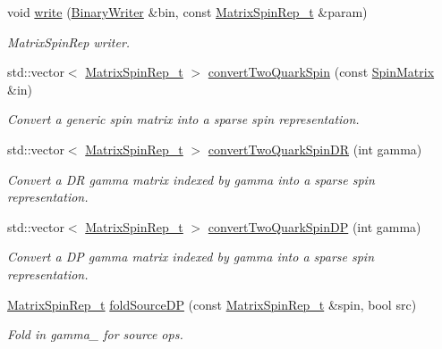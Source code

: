 \begin{DoxyCompactItemize}
void \mbox{\hyperlink{namespaceHadron_ae38baf2d1cfe9fdaf455f274e722b32f}{write}} (\mbox{\hyperlink{classADATIO_1_1BinaryWriter}{Binary\+Writer}} \&bin, const \mbox{\hyperlink{structHadron_1_1MatrixSpinRep__t}{Matrix\+Spin\+Rep\+\_\+t}} \&param)
\begin{DoxyCompactList}\small\item\em Matrix\+Spin\+Rep writer. \end{DoxyCompactList}\item 
std\+::vector$<$ \mbox{\hyperlink{structHadron_1_1MatrixSpinRep__t}{Matrix\+Spin\+Rep\+\_\+t}} $>$ \mbox{\hyperlink{namespaceHadron_a6bcb90f42724a0f4ce09eeb64bd54c80}{convert\+Two\+Quark\+Spin}} (const \mbox{\hyperlink{group__defs_gad066768e154e358a7f3c0708c774be29}{Spin\+Matrix}} \&in)
\begin{DoxyCompactList}\small\item\em Convert a generic spin matrix into a sparse spin representation. \end{DoxyCompactList}\item 
std\+::vector$<$ \mbox{\hyperlink{structHadron_1_1MatrixSpinRep__t}{Matrix\+Spin\+Rep\+\_\+t}} $>$ \mbox{\hyperlink{namespaceHadron_aadefc7d519d40f16cb37c4df644944e7}{convert\+Two\+Quark\+Spin\+DR}} (int gamma)
\begin{DoxyCompactList}\small\item\em Convert a DR gamma matrix indexed by gamma into a sparse spin representation. \end{DoxyCompactList}\item 
std\+::vector$<$ \mbox{\hyperlink{structHadron_1_1MatrixSpinRep__t}{Matrix\+Spin\+Rep\+\_\+t}} $>$ \mbox{\hyperlink{namespaceHadron_a9d2555db4b8f920142f7c79e6752eccd}{convert\+Two\+Quark\+Spin\+DP}} (int gamma)
\begin{DoxyCompactList}\small\item\em Convert a DP gamma matrix indexed by gamma into a sparse spin representation. \end{DoxyCompactList}\item 
\mbox{\hyperlink{structHadron_1_1MatrixSpinRep__t}{Matrix\+Spin\+Rep\+\_\+t}} \mbox{\hyperlink{namespaceHadron_aa258f26ea52528eac314f32a02bf8ac3}{fold\+Source\+DP}} (const \mbox{\hyperlink{structHadron_1_1MatrixSpinRep__t}{Matrix\+Spin\+Rep\+\_\+t}} \&spin, bool src)
\begin{DoxyCompactList}\small\item\em Fold in gamma\+\_ for source ops. \end{DoxyCompactList}\item 

\end{DoxyCompactItemize}
